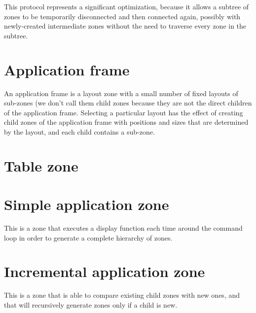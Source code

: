 This protocol represents a significant optimization, because it allows
a subtree of zones to be temporarily disconnected and then connected
again, possibly with newly-created intermediate zones without the need
to traverse every zone in the subtree. 

\section{Application frame}

An application frame is a layout zone with a small number of fixed
layouts of sub-zones (we don't call them child zones because they
are not the direct children of the application frame.  Selecting a
particular layout has the effect of creating child zones of the
application frame with positions and sizes that are determined by the
layout, and each child contains a sub-zone.

\section{Table zone}

\section{Simple application zone}

This is a zone that executes a display function each time around the
command loop in order to generate a complete hierarchy of zones.

\section{Incremental application zone}

This is a zone that is able to compare existing child zones with
new ones, and that will recursively generate zones only if a child
is new. 

